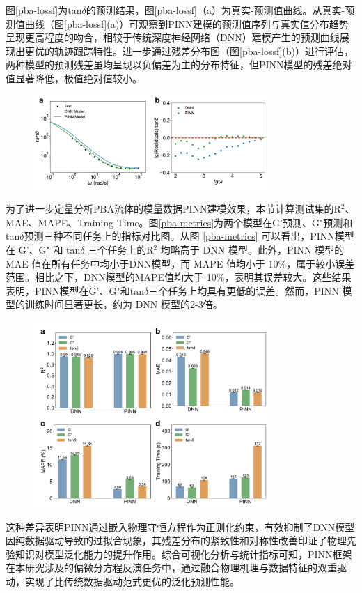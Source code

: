 图\ref{pba-lossf}为tan$\delta$的预测结果，图\ref{pba-lossf}（a）为真实-预测值曲线。从真实-预测值曲线（图\ref{pba-lossf}(a)）可观察到PINN建模的预测值序列与真实值分布趋势呈现更高程度的吻合，相较于传统深度神经网络（DNN）建模产生的预测曲线展现出更优的轨迹跟踪特性。进一步通过残差分布图（图\ref{pba-lossf}(b)）进行评估，两种模型的预测残差虽均呈现以负偏差为主的分布特征，但PINN模型的残差绝对值显著降低，极值绝对值较小。
\begin{figure}[htbp]
  \centering
  \includegraphics[width=0.8\textwidth]{Fig/pba-lossf.pdf}
\end{figure}
为了进一步定量分析PBA流体的模量数据PINN建模效果，本节计算测试集的R$^2$、MAE、MAPE、Training Time。图\ref{pba-metrics}为两个模型在G'预测、G"预测和tan$\delta$预测三种不同任务上的指标对比图。从图 \ref{pba-metrics} 可以看出，PINN模型在 G'、G" 和 tan$\delta$ 三个任务上的R$^2$ 均略高于 DNN 模型。此外，PINN 模型的 MAE 值在所有任务中均小于DNN模型，而 MAPE 值均小于 10\%，属于较小误差范围。相比之下，DNN模型的MAPE值均大于 10\%，表明其误差较大。这些结果表明，PINN模型在G'、G"和tan$\delta$三个任务上均具有更低的误差。然而，PINN 模型的训练时间显著更长，约为 DNN 模型的2-3倍。
\begin{figure}[htbp]
  \centering
  \includegraphics[width=0.8\textwidth]{Fig/pba-metrics.pdf}
\end{figure}
这种差异表明PINN通过嵌入物理守恒方程作为正则化约束，有效抑制了DNN模型因纯数据驱动导致的过拟合现象，其残差分布的紧致性和对称性改善印证了物理先验知识对模型泛化能力的提升作用。综合可视化分析与统计指标可知，PINN框架在本研究涉及的偏微分方程反演任务中，通过融合物理机理与数据特征的双重驱动，实现了比传统数据驱动范式更优的泛化预测性能。
